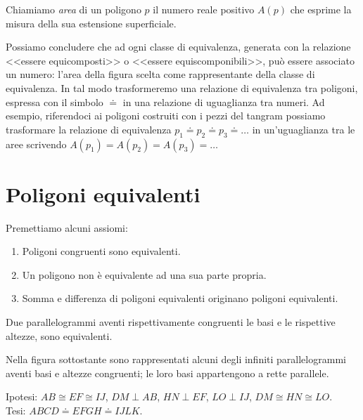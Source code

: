 \begin{definizione}
Chiamiamo \emph{area} di un poligono $p$ il numero reale positivo 
$A(p)$ che esprime la misura della sua estensione superficiale.
\end{definizione}

Possiamo concludere che ad ogni classe di equivalenza, generata con 
la relazione <<essere equicomposti>> o <<essere equiscomponibili>>, 
può essere associato un numero: l'area della figura scelta come 
rappresentante della classe di equivalenza. In tal modo trasformeremo 
una relazione di equivalenza tra poligoni, espressa con il simbolo 
$\doteq$ in una relazione di uguaglianza tra numeri.
Ad esempio, riferendoci ai poligoni costruiti con i pezzi del tangram 
possiamo trasformare la relazione di equivalenza $p_1\doteq p_2\doteq 
p_3\doteq \ldots{}$ in un'uguaglianza tra le aree scrivendo 
$A(p_1)=A(p_2)=A(p_3)=\ldots{}$

\section{Poligoni equivalenti}
\label{sect:poligoni_equivalenti}

Premettiamo alcuni assiomi:
\nopagebreak
\begin{enumerate} [noitemsep]
\item Poligoni congruenti sono equivalenti.
\item Un poligono non è equivalente ad una sua parte propria.
\item Somma e differenza di poligoni equivalenti originano poligoni 
equivalenti.
\end{enumerate}

\begin{teorema}\label{teo:7.1}
Due parallelogrammi aventi rispettivamente congruenti le basi e le 
rispettive altezze, sono equivalenti.
\end{teorema}

Nella figura sottostante sono rappresentati alcuni degli infiniti 
parallelogrammi aventi basi e altezze congruenti; le loro basi 
appartengono a rette parallele.

\noindent Ipotesi: $AB\cong EF\cong IJ$, $DM\perp AB$, $HN\perp EF$, 
$LO\perp IJ$, $DM\cong HN\cong LO$.\\
Tesi: $ABCD\doteq EFGH\doteq IJLK$.\\

\begin{figure*}[!htb]
  
\centering
\end{figure*}

